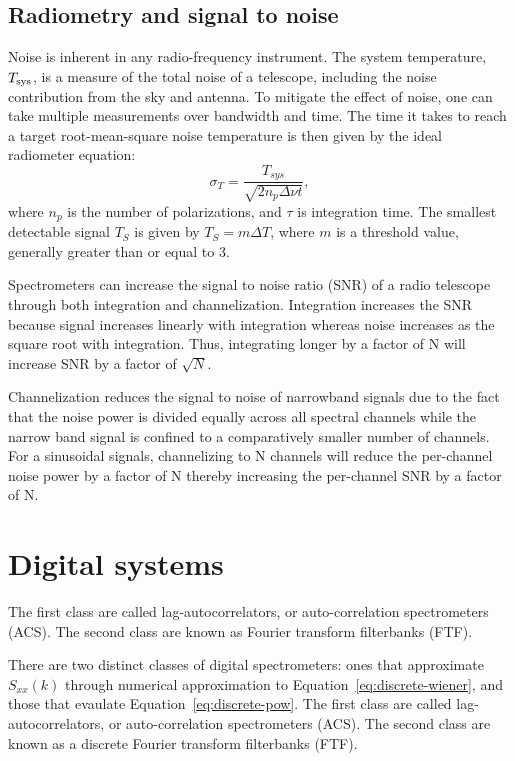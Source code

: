 \documentclass{ws-rv961x669}
\begin{document}
\subsection{Radiometry and signal to noise}

Noise is inherent in any radio-frequency instrument. The system temperature, $T_{\rm{sys}}$, is a measure of the total noise of a telescope, including the noise contribution from the sky and antenna. To mitigate the effect of noise, one can take multiple measurements over bandwidth and time. The time it takes to reach a target root-mean-square noise temperature is then given by the ideal radiometer equation: 
\begin{equation}
\sigma_{T}=\frac{T_{sys}}{\sqrt{\mbox{2}n_{p}\Delta\nu t}},\label{eq:radiometer-eqn}
\end{equation}
where $n_{p}$ is the number of polarizations, and $\tau$ is integration time. The smallest detectable signal $T_{S}$ is given by $T_{S}=m\Delta T$, where $m$ is a threshold value, generally greater than or equal to 3. 

Spectrometers can increase the signal to noise ratio (SNR) of a radio telescope through both integration and channelization. Integration increases the SNR because signal increases linearly with integration whereas noise increases as the square root with integration. Thus, integrating longer by a factor of N will increase SNR by a factor of $\sqrt{N}$.

Channelization reduces the signal to noise of narrowband signals due to the fact that the noise power is divided equally across all spectral channels while the narrow band signal is confined to a comparatively smaller number of channels. For a sinusoidal signals, channelizing to N channels will reduce the per-channel noise power by a factor of N thereby increasing the per-channel SNR by a factor of N.


\section{Digital systems}

The first class are called lag-autocorrelators, or auto-correlation spectrometers (ACS). The second class are known as Fourier transform filterbanks (FTF).

There are two distinct classes of digital spectrometers: ones that approximate $S_{xx}(k)$ through numerical approximation to Equation~\ref{eq:discrete-wiener}, and those that evaulate Equation~\ref{eq:discrete-pow}. The first class are called lag-autocorrelators, or auto-correlation spectrometers (ACS). The second class are known as a discrete Fourier transform filterbanks (FTF).  
\end{document}
